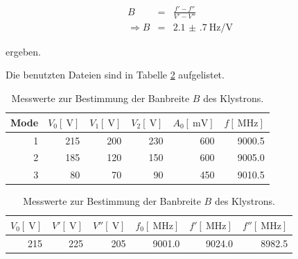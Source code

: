 \begin{eqnarray}
	B &=& \frac{f'-f''}{V'-V''}\\
	\Rightarrow B &=& \SI{2.1(7)}{\hertz\per\volt}
\end{eqnarray}

ergeben.

Die benutzten Dateien sind in Tabelle \ref{v1} aufgelistet.

\begin{table}
\centering
\begin{tabular}{r r r r r r}
	Mode & $V_\text{0}[\SI{}{\volt}]$ & $V_\text{1}[\SI{}{\volt}]$ & $V_\text{2}[\SI{}{\volt}]$ & $A_\text{0}[\SI{}{\milli\volt}]$ & $f[\SI{}{\mega\hertz}]$ \\
	\hline
	\hline
	1 & 215 & 200 & 230 & 600 & 9000.5\\
	2 & 185 & 120 & 150 & 600 & 9005.0\\
	3 &  80 &  70 &  90 & 450 & 9010.5\\
	\hline
\end{tabular}
\caption{Messwerte zur Darstellung des Modus-Diagramms.}
\begin{tabular}{r r r r r r}
	$V_\text{0}[\SI{}{\volt}]$ & $V'[\SI{}{\volt}]$ & $V''[\SI{}{\volt}]$ & $f_\text{0}[\SI{}{\mega\hertz}]$  & $f'[\SI{}{\mega\hertz}]$ & $f''[\SI{}{\mega\hertz}]$ \\
	\hline
	\hline
	215 & 225 & 205 & 9001.0 & 9024.0 & 8982.5\\
	\hline
\end{tabular}
\caption{Messwerte zur Bestimmung der Banbreite $B$ des Klystrons.}
\label{v1}
\end{table}

